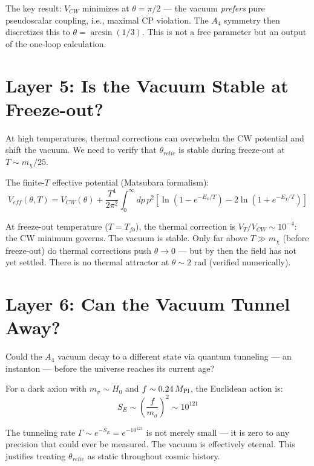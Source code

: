 The key result: $V_{CW}$ minimizes at $\theta = \pi/2$ — the vacuum
\emph{prefers} pure pseudoscalar coupling, i.e., maximal CP violation.
The $A_4$ symmetry then discretizes this to $\theta = \arcsin(1/3)$.
This is not a free parameter but an output of the one-loop calculation.

\section{Layer 5: Is the Vacuum Stable at Freeze-out?}
\label{ch2:matsubara}

At high temperatures, thermal corrections can overwhelm the CW potential
and shift the vacuum. We need to verify that $\theta_{relic}$ is stable
during freeze-out at $T \sim m_\chi/25$.

The finite-$T$ effective potential (Matsubara formalism):
\begin{equation}
  V_{eff}(\theta, T) = V_{CW}(\theta) + \frac{T^4}{2\pi^2}\int_0^\infty dp\,p^2
  \left[\ln(1 - e^{-E_\phi/T}) - 2\ln(1 + e^{-E_\chi/T})\right]
\end{equation}

At freeze-out temperature ($T = T_{fo}$), the thermal correction is
$V_T/V_{CW} \sim 10^{-4}$: the CW minimum governs. The vacuum is stable.
Only far above $T \gg m_\chi$ (before freeze-out) do thermal corrections
push $\theta \to 0$ — but by then the field has not yet settled.
There is no thermal attractor at $\theta \sim 2$ rad (verified numerically).

\section{Layer 6: Can the Vacuum Tunnel Away?}
\label{ch2:instanton}

Could the $A_4$ vacuum decay to a different state via quantum tunneling —
an instanton — before the universe reaches its current age?

For a dark axion with $m_\sigma \sim H_0$ and $f \sim 0.24\,M_{\rm Pl}$,
the Euclidean action is:
\begin{equation}
  S_E \sim \left(\frac{f}{m_\sigma}\right)^2 \sim 10^{121}
\end{equation}

The tunneling rate $\Gamma \sim e^{-S_E} = e^{-10^{121}}$ is not merely small
— it is zero to any precision that could ever be measured. The vacuum is
effectively eternal. This justifies treating $\theta_{relic}$ as static
throughout cosmic history.

